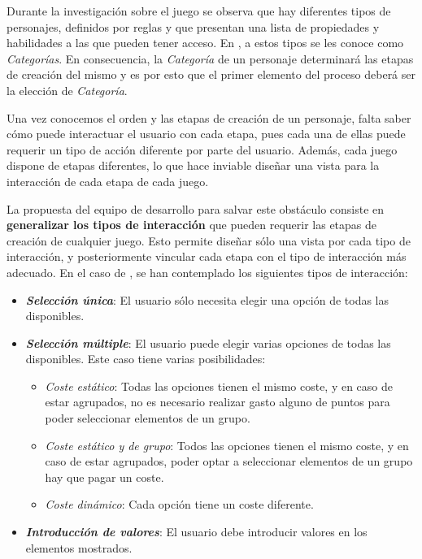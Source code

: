 Durante la investigación sobre el juego se observa que hay diferentes tipos de personajes, definidos por 
reglas y que presentan una lista de propiedades y habilidades a las que pueden tener acceso. En \anima, 
a estos tipos se les conoce como \textit{Categorías}. En consecuencia, la \textit{Categoría} de un personaje 
determinará las etapas de creación del mismo y es por esto que el primer elemento del proceso deberá ser 
la elección de \textit{Categoría}. \medskip

Una vez conocemos el orden y las etapas de creación de un personaje, falta saber cómo puede interactuar el usuario 
con cada etapa, pues cada una de ellas puede requerir un tipo de acción diferente por parte del usuario. Además, 
cada juego dispone de etapas diferentes, lo que hace inviable diseñar una vista para la interacción de cada etapa 
de cada juego. \medskip

La propuesta del equipo de desarrollo para salvar este obstáculo consiste en \textbf{generalizar los tipos de interacción} que pueden 
requerir las etapas de creación de cualquier juego. Esto permite diseñar sólo una vista por cada tipo de interacción, y posteriormente 
vincular cada etapa con el tipo de interacción más adecuado. En el caso de \anima, se han contemplado los siguientes 
tipos de interacción: 

\begin{itemize}
    \item \textit{\textbf{Selección única}}: El usuario sólo necesita elegir una opción de todas las disponibles.
    \item \textit{\textbf{Selección múltiple}}: El usuario puede elegir varias opciones de todas las disponibles. 
    Este caso tiene varias posibilidades:
    \begin{itemize}
        \item \textit{Coste estático}: Todas las opciones tienen el mismo coste, y en caso de estar agrupados, no es necesario 
        realizar gasto alguno de puntos para poder seleccionar elementos de un grupo.
        \item \textit{Coste estático y de grupo}: Todos las opciones tienen el mismo coste, y en caso de estar agrupados, poder 
        optar a seleccionar elementos de un grupo hay que pagar un coste.
        \item \textit{Coste dinámico}: Cada opción tiene un coste diferente.
    \end{itemize}
    \item \textit{\textbf{Introducción de valores}}: El usuario debe introducir valores en los elementos mostrados.
\end{itemize}\medskip

